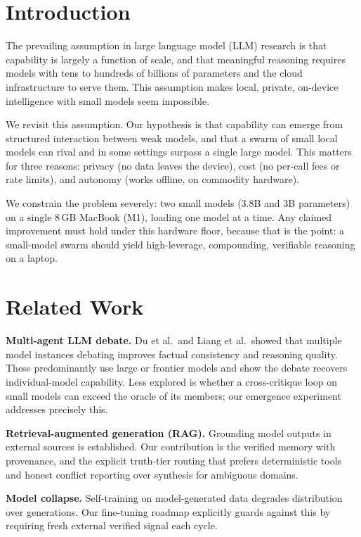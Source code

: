 \documentclass[conference,compsoc]{IEEEtran}
\begin{document}
\section{Introduction}
The prevailing assumption in large language model (LLM) research is that capability is largely a function of scale, and that meaningful reasoning requires models with tens to hundreds of billions of parameters and the cloud infrastructure to serve them. This assumption makes local, private, on-device intelligence with small models seem impossible.

We revisit this assumption. Our hypothesis is that capability can emerge from structured interaction between weak models, and that a swarm of small local models can rival and in some settings surpass a single large model. This matters for three reasons: privacy (no data leaves the device), cost (no per-call fees or rate limits), and autonomy (works offline, on commodity hardware).

We constrain the problem severely: two small models (3.8B and 3B parameters) on a single 8\,GB MacBook (M1), loading one model at a time. Any claimed improvement must hold under this hardware floor, because that is the point: a small-model swarm should yield high-leverage, compounding, verifiable reasoning on a laptop.

\section{Related Work}
\textbf{Multi-agent LLM debate.} Du et al.\ and Liang et al.\ showed that multiple model instances debating improves factual consistency and reasoning quality\cite{du2023improving,liang2023encouraging}. These predominantly use large or frontier models and show the debate recovers individual-model capability. Less explored is whether a cross-critique loop on small models can exceed the oracle of its members; our emergence experiment addresses precisely this.

\textbf{Retrieval-augmented generation (RAG).} Grounding model outputs in external sources is established\cite{lewis2020retrieval}. Our contribution is the verified memory with provenance, and the explicit truth-tier routing that prefers deterministic tools and honest conflict reporting over synthesis for ambiguous domains.

\textbf{Model collapse.} Self-training on model-generated data degrades distribution over generations\cite{shumailov2024curse}. Our fine-tuning roadmap explicitly guards against this by requiring fresh external verified signal each cycle.
\end{document}
